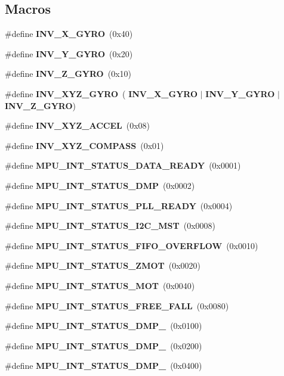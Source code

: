\subsection*{Macros}
\begin{DoxyCompactItemize}
\item 
\#define \textbf{ I\+N\+V\+\_\+\+X\+\_\+\+G\+Y\+RO}~(0x40)
\item 
\#define \textbf{ I\+N\+V\+\_\+\+Y\+\_\+\+G\+Y\+RO}~(0x20)
\item 
\#define \textbf{ I\+N\+V\+\_\+\+Z\+\_\+\+G\+Y\+RO}~(0x10)
\item 
\#define \textbf{ I\+N\+V\+\_\+\+X\+Y\+Z\+\_\+\+G\+Y\+RO}~(\textbf{ I\+N\+V\+\_\+\+X\+\_\+\+G\+Y\+RO} $\vert$ \textbf{ I\+N\+V\+\_\+\+Y\+\_\+\+G\+Y\+RO} $\vert$ \textbf{ I\+N\+V\+\_\+\+Z\+\_\+\+G\+Y\+RO})
\item 
\#define \textbf{ I\+N\+V\+\_\+\+X\+Y\+Z\+\_\+\+A\+C\+C\+EL}~(0x08)
\item 
\#define \textbf{ I\+N\+V\+\_\+\+X\+Y\+Z\+\_\+\+C\+O\+M\+P\+A\+SS}~(0x01)
\item 
\#define \textbf{ M\+P\+U\+\_\+\+I\+N\+T\+\_\+\+S\+T\+A\+T\+U\+S\+\_\+\+D\+A\+T\+A\+\_\+\+R\+E\+A\+DY}~(0x0001)
\item 
\#define \textbf{ M\+P\+U\+\_\+\+I\+N\+T\+\_\+\+S\+T\+A\+T\+U\+S\+\_\+\+D\+MP}~(0x0002)
\item 
\#define \textbf{ M\+P\+U\+\_\+\+I\+N\+T\+\_\+\+S\+T\+A\+T\+U\+S\+\_\+\+P\+L\+L\+\_\+\+R\+E\+A\+DY}~(0x0004)
\item 
\#define \textbf{ M\+P\+U\+\_\+\+I\+N\+T\+\_\+\+S\+T\+A\+T\+U\+S\+\_\+\+I2\+C\+\_\+\+M\+ST}~(0x0008)
\item 
\#define \textbf{ M\+P\+U\+\_\+\+I\+N\+T\+\_\+\+S\+T\+A\+T\+U\+S\+\_\+\+F\+I\+F\+O\+\_\+\+O\+V\+E\+R\+F\+L\+OW}~(0x0010)
\item 
\#define \textbf{ M\+P\+U\+\_\+\+I\+N\+T\+\_\+\+S\+T\+A\+T\+U\+S\+\_\+\+Z\+M\+OT}~(0x0020)
\item 
\#define \textbf{ M\+P\+U\+\_\+\+I\+N\+T\+\_\+\+S\+T\+A\+T\+U\+S\+\_\+\+M\+OT}~(0x0040)
\item 
\#define \textbf{ M\+P\+U\+\_\+\+I\+N\+T\+\_\+\+S\+T\+A\+T\+U\+S\+\_\+\+F\+R\+E\+E\+\_\+\+F\+A\+LL}~(0x0080)
\item 
\#define \textbf{ M\+P\+U\+\_\+\+I\+N\+T\+\_\+\+S\+T\+A\+T\+U\+S\+\_\+\+D\+M\+P\+\_}~(0x0100)
\item 
\#define \textbf{ M\+P\+U\+\_\+\+I\+N\+T\+\_\+\+S\+T\+A\+T\+U\+S\+\_\+\+D\+M\+P\+\_}~(0x0200)
\item 
\#define \textbf{ M\+P\+U\+\_\+\+I\+N\+T\+\_\+\+S\+T\+A\+T\+U\+S\+\_\+\+D\+M\+P\+\_}~(0x0400)

\end{DoxyCompactItemize}
